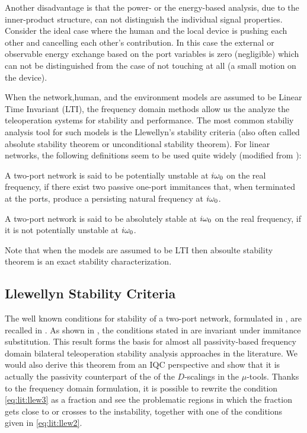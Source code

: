 Another disadvantage is that the power- or the energy-based analysis, due to the inner-product structure, can not distinguish the individual 
signal properties. Consider the ideal case where the human and the local device is pushing each other and cancelling each other's contribution. 
In this case the external or observable energy exchange based on the port variables is zero (negligible) which can not be distinguished from 
the case of not touching at all (a small motion on the device). 


When the network,human, and the environment models are assumed to be Linear Time Invariant (LTI), the frequency domain methods
allow us the analyze the teleoperation systems for stability and performance. The most common stabiliy analysis tool for such 
models is the Llewellyn's stability criteria (also often called absolute stability theorem or unconditional stability theorem). 
For linear networks, the following definitions seem to be used quite widely (modified from \cite{chen91}): 

\begin{define} A two-port network is said to be potentially unstable at $i\omega_0$ on the real frequency, 
if there exist two passive one-port immitances that, when terminated at the ports, produce a persisting natural frequency at $i\omega_0$.   
\end{define}

\begin{define} A two-port network is said to be absolutely stable at $i\omega_0$ on the real frequency, 
if it is not potentially unstable at $i\omega_0$.   
\end{define}

Note that when the models are assumed to be LTI then absoulte stability theorem is an exact stability characterization. 

\subsection{Llewellyn Stability Criteria}\label{sec:llewellyn}
The well known conditions for stability of a two-port network, formulated in \cite{llewellyn,bolinder,rollett}, are recalled in .
As shown in \cite{rollett}, the conditions stated in  are invariant under immitance substitution. This result forms the 
basis for almost all passivity-based frequency domain bilateral teleoperation stability analysis approaches in the literature. 
We would also derive this theorem from an IQC perspective and show that it is actually the passivity counterpart of the 
of the $D$-scalings in the $\mu$-tools. Thanks to the frequency domain formulation, it is possible  to rewrite the condition 
\eqref{eq:lit:llew3} as a fraction and see the problematic regions in which the fraction gets close to or crosses to the instability, 
together with one of the conditions given in \eqref{eq:lit:llew2}. 


